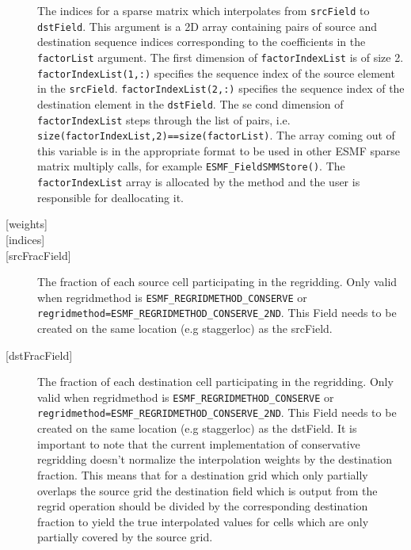 \begin{description}
             The indices for a sparse matrix which interpolates from {\tt srcField} to 
             {\tt dstField}. This argument is a 2D array containing pairs of source and destination
             sequence indices corresponding to the coefficients in the {\tt factorList} argument. 
             The first dimension of {\tt factorIndexList} is of size 2. {\tt factorIndexList(1,:)} specifies 
             the sequence index of the source element in the {\tt srcField}. {\tt factorIndexList(2,:)} specifies 
             the sequence index of the destination element in the {\tt dstField}. The se cond dimension of 
             {\tt factorIndexList} steps through the list of pairs, i.e. {\tt size(factorIndexList,2)==size(factorList)}.
             The array coming out of this variable is in the appropriate format to be used
             in other ESMF sparse matrix multiply calls, for example {\tt ESMF\_FieldSMMStore()}. 
             The {\tt factorIndexList} array is allocated by the method and the user is responsible for deallocating it. 
       \item [{[weights]}] 
       \item [{[indices]}] 
       \item [{[srcFracField]}] 
             The fraction of each source cell participating in the regridding. Only 
             valid when regridmethod is {\tt ESMF\_REGRIDMETHOD\_CONSERVE} or  {\tt regridmethod=ESMF\_REGRIDMETHOD\_CONSERVE\_2ND}.
             This Field needs to be created on the same location (e.g staggerloc) 
             as the srcField.
       \item [{[dstFracField]}] 
             The fraction of each destination cell participating in the regridding. Only 
             valid when regridmethod is {\tt ESMF\_REGRIDMETHOD\_CONSERVE} or  {\tt regridmethod=ESMF\_REGRIDMETHOD\_CONSERVE\_2ND}.
             This Field needs to be created on the same location (e.g staggerloc) 
             as the dstField. It is important to note that the current implementation
             of conservative regridding doesn't normalize the interpolation weights by the destination fraction. This   means that for a destination
             grid which only partially overlaps the source grid the destination field which is output from the 
             regrid operation should be divided by the corresponding destination fraction to yield the 
             true interpolated values for cells which are only partially covered by the  source grid. 

\end{description}
